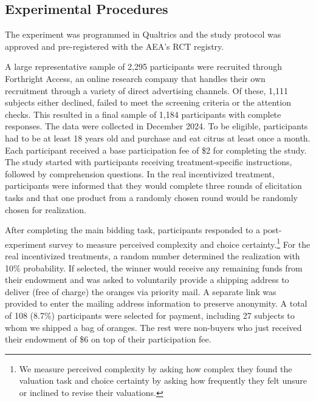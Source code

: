\documentclass[12pt]{article}
\begin{document}
\subsection{Experimental Procedures}
The experiment was programmed in Qualtrics and the study protocol was approved %
and pre-registered with the AEA's RCT registry.

A large representative sample of 2,295 participants were recruited through Forthright Access, an online research company that handles their own recruitment through a variety of direct advertising channels. Of these, 1,111 subjects either declined, failed to meet the screening criteria or the attention checks. This resulted in a final sample of 1,184 participants with complete responses. The data were collected in December 2024. To be eligible, participants had to be at least 18 years old and purchase and eat citrus at least once a month. 
Each participant received a base participation fee of \$2 for completing the study. The study started with participants receiving treatment-specific instructions, followed by comprehension questions. In the real incentivized treatment, participants were informed that they would complete three rounds of elicitation tasks and that one product from a randomly chosen round would be randomly chosen for realization. 

After completing the main bidding task, participants responded to a post-experiment survey to measure perceived complexity and choice certainty.\footnote{We measure perceived complexity by asking how complex they found the valuation task and choice certainty by asking how frequently they felt unsure or inclined to revise their valuations.} For the real incentivized treatments, a random number determined the realization with 10\% probability.  If selected, the winner would receive any remaining funds from their endowment and was asked to voluntarily provide a shipping address to deliver (free of charge) the oranges via priority mail. A separate link was provided to enter the mailing address information to preserve anonymity. A total of 108 (8.7\%) participants were selected for payment, including 27 subjects to whom we shipped a bag of oranges. The rest were non-buyers who just received their endowment of \$6 on top of their participation fee. 
\end{document}
